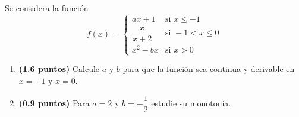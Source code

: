 
Se considera la función
\[
f(x)=\begin{cases}
ax+1 & \text{si }x\leq -1\\[4pt]
\dfrac{x}{x+2} & \text{si }-1<x\leq 0\\[4pt]
x^2-bx & \text{si }x>0
\end{cases}
\]
\begin{enumerate}[label=\alph*)]
\item \textbf{(1.6 puntos)} Calcule $a$ y $b$ para que la función sea continua y derivable en $x=-1$ y $x=0$.
\item \textbf{(0.9 puntos)} Para $a=2$ y $b=-\dfrac{1}{2}$ estudie su monotonía.
\end{enumerate}
